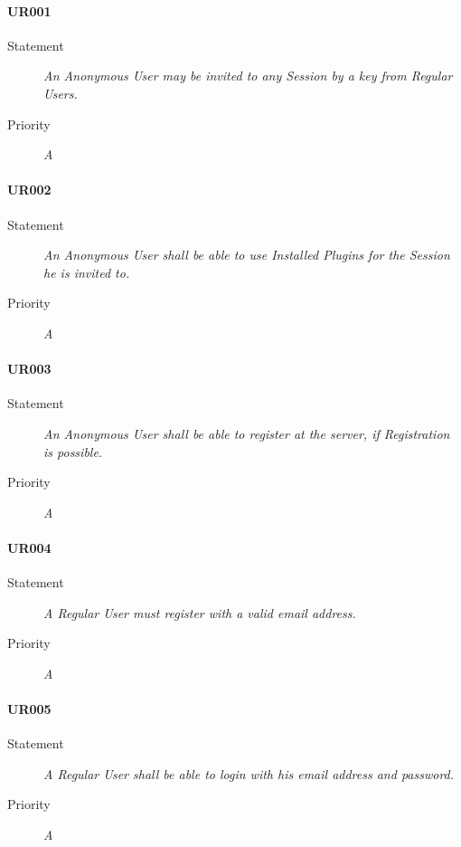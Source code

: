 \paragraph{UR001}
\begin{description}
  \item [Statement] 
    \textit{An \gls{Anonymous User} may be invited to any \gls{Session} by a key from \gls{Regular User}s.}
  \item [Priority] \textit{A}
\end{description}

\paragraph{UR002}
\begin{description}
  \item [Statement] 
    \textit{An \gls{Anonymous User} shall be able to use \gls{Installed Plugins} for the \gls{Session} he is invited to.}
  \item [Priority] \textit{A}
\end{description}

\paragraph{UR003}
\begin{description}
  \item [Statement] 
    \textit{An \gls{Anonymous User} shall be able to register at the server, if \gls{Registration} is possible.}
  \item [Priority] \textit{A}
\end{description}

\paragraph{UR004}
\begin{description}
  \item [Statement] 
    \textit{A \gls{Regular User} must register with a valid email address.}
  \item [Priority] \textit{A}
\end{description}

\paragraph{UR005}
\begin{description}
  \item [Statement] 
    \textit{A \gls{Regular User} shall be able to login with his email address and password.}
  \item [Priority] \textit{A}
\end{description}

